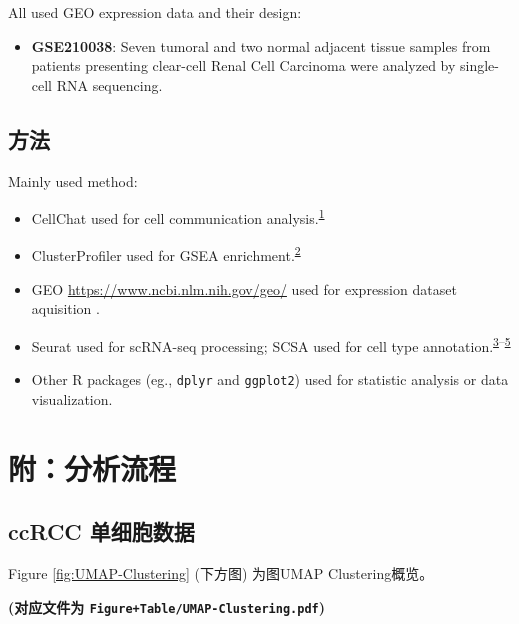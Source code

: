 \documentclass[
]{article}
\providecommand{\tightlist}{%
  \setlength{\itemsep}{0pt}\setlength{\parskip}{0pt}}
\begin{document}
All used GEO expression data and their design:

\begin{itemize}
\tightlist
\item
  \textbf{GSE210038}: Seven tumoral and two normal adjacent tissue samples from patients presenting clear-cell Renal Cell Carcinoma were analyzed by single-cell RNA sequencing.
\end{itemize}

\hypertarget{ux65b9ux6cd5}{%
\subsection{方法}\label{ux65b9ux6cd5}}

Mainly used method:

\begin{itemize}
\tightlist
\item
  CellChat used for cell communication analysis.\textsuperscript{\protect\hyperlink{ref-InferenceAndAJinS2021}{1}}
\item
  ClusterProfiler used for GSEA enrichment.\textsuperscript{\protect\hyperlink{ref-ClusterprofilerWuTi2021}{2}}
\item
  GEO \url{https://www.ncbi.nlm.nih.gov/geo/} used for expression dataset aquisition .
\item
  Seurat used for scRNA-seq processing; SCSA used for cell type annotation.\textsuperscript{\protect\hyperlink{ref-IntegratedAnalHaoY2021}{3}--\protect\hyperlink{ref-ScsaACellTyCaoY2020}{5}}
\item
  Other R packages (eg., \texttt{dplyr} and \texttt{ggplot2}) used for statistic analysis or data visualization.
\end{itemize}

\hypertarget{workflow}{%
\section{附：分析流程}\label{workflow}}

\hypertarget{ccrcc-ux5355ux7ec6ux80deux6570ux636e}{%
\subsection{ccRCC 单细胞数据}\label{ccrcc-ux5355ux7ec6ux80deux6570ux636e}}

Figure \ref{fig:UMAP-Clustering} (下方图) 为图UMAP Clustering概览。

\textbf{(对应文件为 \texttt{Figure+Table/UMAP-Clustering.pdf})}
\end{document}

